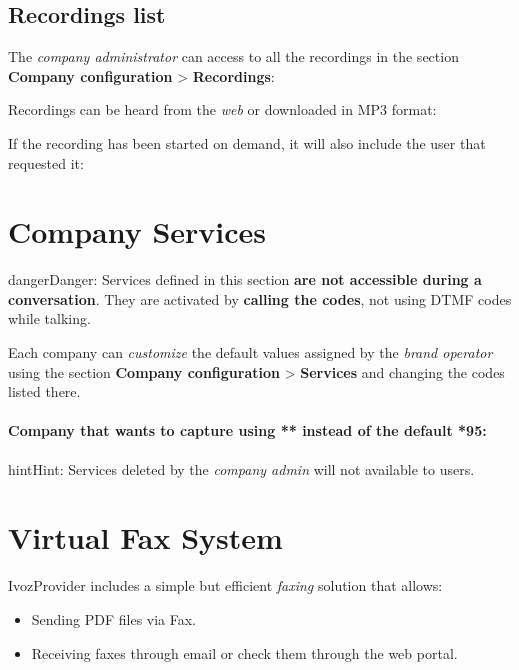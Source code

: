 \documentclass[letterpaper,10pt,english]{sphinxmanual}
\begin{document}
\subsection{Recordings list}
\label{company/call_recording:recordings-list}
The \emph{company administrator} can access to all the recordings in the section
\textbf{Company configuration} \textgreater{} \textbf{Recordings}:

\noindent{}

Recordings can be heard from the \emph{web} or downloaded in MP3 format:

\noindent{}

If the recording has been started on demand, it will also include the user
that requested it:

\noindent{}


\section{Company Services}
\label{company/services::doc}\label{company/services:company-services}\label{company/services:id1}
\begin{notice}{danger}{Danger:}
Services defined in this section \textbf{are not accessible during a
conversation}. They are activated by \textbf{calling the codes}, not using
DTMF codes while talking.
\end{notice}

Each company can \emph{customize} the default values assigned by the \emph{brand operator}
using the section \textbf{Company configuration} \textgreater{} \textbf{Services} and changing the codes
listed there.
\paragraph{Company that wants to capture using ** instead of the default *95:}

\noindent{}

\begin{notice}{hint}{Hint:}
Services deleted by the \emph{company admin} will not available to users.
\end{notice}


\section{Virtual Fax System}
\label{company/faxing:virtual-fax-system}\label{company/faxing::doc}\label{company/faxing:faxing-system}
IvozProvider includes a simple but efficient \emph{faxing} solution that allows:
\begin{itemize}
\item {} 
Sending PDF files via Fax.

\item {} 
Receiving faxes through email or check them through the web portal.

\end{itemize}
\end{document}
